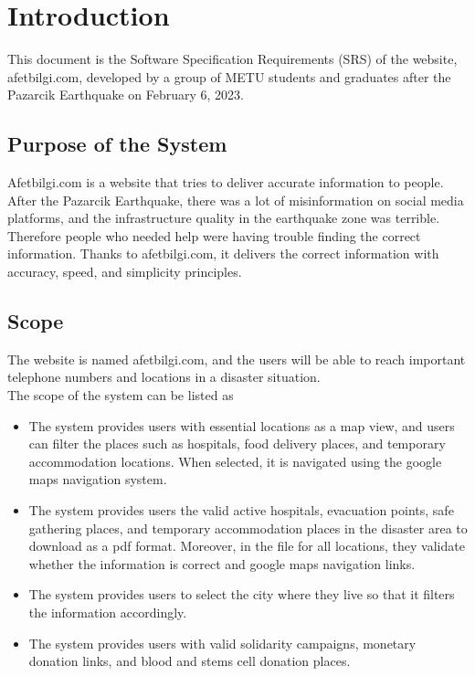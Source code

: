 \chapter{Introduction}

This document is the Software Specification Requirements (SRS) of the website, afetbilgi.com, developed by a group of METU students and graduates after the Pazarcik Earthquake on February 6, 2023.

\section{Purpose of the System}

Afetbilgi.com is a website that tries to deliver accurate information to people.
After the Pazarcik Earthquake, there was a lot of misinformation on social media platforms, and the infrastructure quality in the earthquake zone was terrible. 
Therefore people who needed help were having trouble finding the correct information.
Thanks to afetbilgi.com, it delivers the correct information with accuracy, speed, and simplicity principles.

\section{Scope}

The website is named afetbilgi.com, and the users will be able to reach important telephone numbers and locations in a disaster situation. \\
The scope of the system can be listed as \\
\begin{itemize}
    \item The system provides users with essential locations as a map view, and users can filter the places such as hospitals, food delivery places, and temporary accommodation locations. When selected, it is navigated using the google maps navigation system.
    \item The system provides users the valid active hospitals, evacuation points, safe gathering places, and temporary accommodation places in the disaster area to download as a pdf format. Moreover, in the file for all locations, they validate whether the information is correct and google maps navigation links.
    \item The system provides users to select the city where they live so that it filters the information accordingly.
    \item The system provides users with valid solidarity campaigns, monetary donation links, and blood and stems cell donation places. 
\end{itemize}

